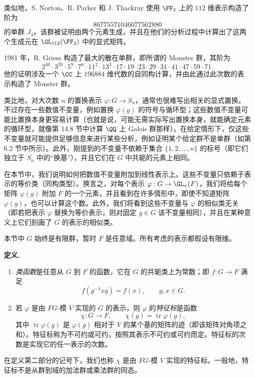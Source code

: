 类似地，S. Norton、R. Parker 和 J. Thackray 使用 $\FF_2$ 上的 $112$ 维表示构造了阶为
\[
  86775571046077562880
\]
的单群 $J_4$。该群被证明由两个元素生成，并且在他们的分析过程中计算出了这两个生成元在 $\GL_{112}(\FF_2)$ 中的显式矩阵。

1981 年，R. Griess 构造了最大的散在单群，即所谓的 Monster 群，其阶为
\[
  2^{46}\cdot3^{20}\cdot5^9\cdot7^6\cdot11^2\cdot13^3\cdot17\cdot19\cdot23\cdot29\cdot31\cdot41\cdot47\cdot59\cdot71.
\]
他的证明涉及一个 $\CC$ 上 $196884$ 维代数的自同构计算，并由此通过此次数的表示构造了 Monster 群。

类比地，对大次数 $n$ 的置换表示 $\varphi:G\to S_n$，通常也很难写出相关的显式置换。不过存在一些数值不变量，例如置换 $\varphi(g)$ 的符号与循环型；这些数值不变量可能比置换本身更容易计算（也就是说，可能无需实际写出置换本身，就能确定元素的循环型，就像第 14.8 节中计算 $\QQ$ 上 Galois 群那样）。在给定情形下，仅这些不变量就可能提供足够信息来进行某些分析，例如证明某个给定群不是单群（如第 6.2 节中所示）。此外，刚提到的不变量不依赖于集合 $\{1,2,
\ldots,n\}$ 的标号（即它们独立于 $S_n$ 中的“换基”），并且它们在 $G$ 中共轭的元素上相同。

在本节中，我们说明如何把数值不变量附加到线性表示上。这些不变量只依赖于表示的等价类（同构类型）。换言之，对每个表示 $\varphi:G\to\GL_n(F)$，我们将给每个矩阵 $\varphi(g)$ 附加 $F$ 的一个元素，并且看到在许多情形中，即使不知道矩阵 $\varphi(g)$，也可以计算这个数。此外，我们将看到这些不变量与 $\varphi$ 的相似类无关（即若把表示 $\varphi$ 替换为等价表示，则对固定 $g\in G$ 该不变量相同），并且在某种意义上它们刻画了 $G$ 的表示的相似类。

本节中 $G$ 始终是有限群，暂时 $F$ 是任意域。所有考虑的表示都假设有限维。

\noindent\textbf{定义.}
\begin{enumerate}[label=(\arabic*)]
  \item \emph{类函数}是任意从 $G$ 到 $F$ 的函数，它在 $G$ 的共轭类上为常数；即 $f:G\to F$ 满足
  \[
    f(g^{-1}xg)=f(x),
    \qquad g,x\in G.
  \]
  \item 若 $\varphi$ 是由 $FG$-模 $V$ 实现的 $G$ 的表示，则 $\varphi$ 的\emph{特征标}是函数
  \[
    \chi:G\to F,
    \qquad \chi(g)=\operatorname{tr}\varphi(g),
  \]
  其中 $\operatorname{tr}\varphi(g)$ 是 $\varphi(g)$ 相对于 $V$ 的某个基的矩阵的迹（即该矩阵对角项之和）。特征标称为不可约或可约，按照其表示不可约或可约而定。特征标的次数是实现它的任一表示的次数。
\end{enumerate}

在定义第二部分的记号下，我们也称 $\chi$ 是由 $FG$-模 $V$ 实现的特征标。一般地，特征标不是从群到域的加法群或乘法群的同态。

